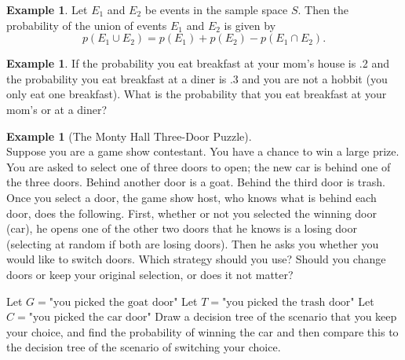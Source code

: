 \documentclass[letterpaper,10pt]{article}
\theoremstyle{plain}
\theoremstyle{definition}
\newtheorem{exmp}[thm]{Example}
\theoremstyle{remark}
\begin{document}
\begin{exmp}
    Let $E_1$ and $E_2$ be events in the sample space $S$. Then the probability of the union of events $E_1$ and $E_2$ is given by
    \[
    p(E_1 \cup E_2) = p(E_1) + p(E_2) - p(E_1 \cap E_2).
    \]
\end{exmp}
\begin{exmp}
If the probability you eat breakfast at your mom's house is .2 and the probability you eat breakfast at a diner is .3 and you are not a hobbit (you only eat one breakfast).
What is the probability that you eat breakfast at your mom's or at a diner?
\vspace{2cm}
\end{exmp}
\begin{exmp}[The Monty Hall Three-Door Puzzle] $ $\\ Suppose you are a game show contestant. You have a
chance to win a large prize. You are asked to select one of three doors to open; the new car
is behind one of the three doors. Behind another door is a goat. Behind the third door is trash. Once you select a door, the
game show host, who knows what is behind each door, does the following. First, whether or not
you selected the winning door (car), he opens one of the other two doors that he knows is a losing
door (selecting at random if both are losing doors). Then he asks you whether you would like to
switch doors. Which strategy should you use? Should you change doors or keep your original
selection, or does it not matter?

\noindent Let $G={\text{"you picked the goat door"}}$
\newline
Let $T={\text{"you picked the trash door"}}$
\newline
Let $C={\text{"you picked the car door"}}$
\newline
Draw a decision tree of the scenario that you keep your choice, and find the probability of winning the car and then compare this to the decision tree of the scenario of switching your choice.
\vspace{3cm}
\end{exmp}
\end{document}
